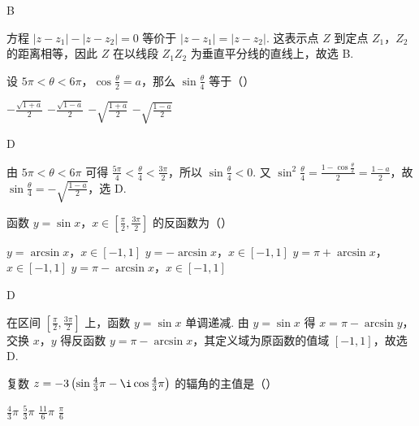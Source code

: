\documentclass[UTF8,a4paper,oneside,11pt]{ctexbook}
\begin{document}
\begin{answer}
B
\end{answer}

\begin{solution}
方程 \(\left|z-z_1\right|-\left|z-z_2\right|=0\) 等价于 \(\left|z-z_1\right|=\left|z-z_2\right|\). 这表示点 \(Z\) 到定点 \(Z_1\)，\(Z_2\) 的距离相等，因此 \(Z\) 在以线段 \(Z_1Z_2\) 为垂直平分线的直线上，故选 B.
\end{solution}

\begin{problem}
设 \(5\pi<\theta<6\pi\)，\(\cos \frac{\theta}{2}=a\)，那么 \(\sin \frac{\theta}{4}\) 等于（\quad）

\choices
    {\(-\frac{\sqrt{1+a}}{2}\)}
    {\(-\frac{\sqrt{1-a}}{2}\)}
    {\(-\sqrt{\frac{1+a}{2}}\)}
    {\(-\sqrt{\frac{1-a}{2}}\)}

\end{problem}

\begin{answer}
D
\end{answer}

\begin{solution}
由 \(5\pi<\theta<6\pi\) 可得 \(\frac{5\pi}{4}<\frac{\theta}{4}<\frac{3\pi}{2}\)，所以 \(\sin\frac{\theta}{4}<0\). 又 \(\sin^2\frac{\theta}{4}=\frac{1-\cos\frac{\theta}{2}}{2}=\frac{1-a}{2}\)，故 \(\sin\frac{\theta}{4}=-\sqrt{\frac{1-a}{2}}\)，选 D.
\end{solution}

\begin{problem}
函数 \(y=\sin x\)，\(x\in \left[\frac{\pi}{2},\frac{3\pi}{2}\right]\) 的反函数为（\quad）

\choices
    {\(y=\arcsin x\)，\(x\in [-1,1]\)}
    {\(y=-\arcsin x\)，\(x\in [-1,1]\)}
    {\(y=\pi+\arcsin x\)，\(x\in [-1,1]\)}
    {\(y=\pi-\arcsin x\)，\(x\in [-1,1]\)}

\end{problem}

\begin{answer}
D
\end{answer}

\begin{solution}
在区间 \(\left[\frac{\pi}{2},\frac{3\pi}{2}\right]\) 上，函数 \(y=\sin x\) 单调递减. 由 \(y=\sin x\) 得 \(x=\pi-\arcsin y\)，交换 \(x\)，\(y\) 得反函数 \(y=\pi-\arcsin x\)，其定义域为原函数的值域 \([-1,1]\)，故选 D.
\end{solution}

\begin{problem}
复数 \(z=-3\left(\sin \frac{4}{3}\pi-\i\cos \frac{4}{3}\pi\right)\) 的辐角的主值是（\quad）

\choices
    {\(\frac{4}{3}\pi\)}
    {\(\frac{5}{3}\pi\)}
    {\(\frac{11}{6}\pi\)}
    {\(\frac{\pi}{6}\)}

\end{problem}
\end{document}
